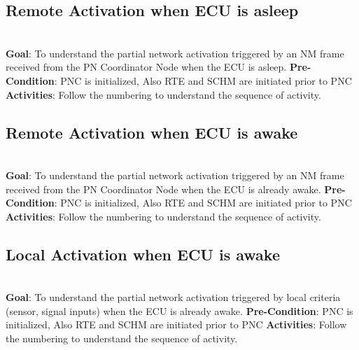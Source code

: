 
   
 

\subsection{Remote Activation when ECU is asleep}
\\
\textbf{Goal}: To understand the partial network activation triggered by an NM frame received from the PN Coordinator Node when the ECU is asleep.\newline
\textbf{Pre-Condition}: PNC is initialized, Also RTE and SCHM are initiated prior to PNC\newline
\textbf{Activities}: Follow the numbering to understand the sequence of activity.


  
 

\subsection{Remote Activation when ECU is awake}
\\
\textbf{Goal}: To understand the partial network activation triggered by an NM frame received from the PN Coordinator Node when the ECU is already awake.\newline
\textbf{Pre-Condition}: PNC is initialized, Also RTE and SCHM are initiated prior to PNC\newline
\textbf{Activities}: Follow the numbering to understand the sequence of activity.


  
 

\subsection{Local Activation when ECU is awake}
\\
\textbf{Goal}: To understand the partial network activation triggered by local criteria (sensor, signal inputs) when the ECU is already awake.\newline
\textbf{Pre-Condition}: PNC is initialized, Also RTE and SCHM are initiated prior to PNC \newline
\textbf{Activities}: Follow the numbering to understand the sequence of activity.

